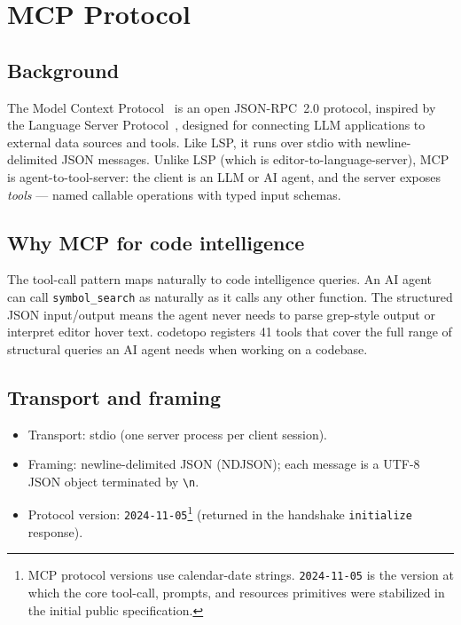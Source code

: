 \section{MCP Protocol}
\label{sec:mcp-protocol}

\subsection{Background}

The Model Context Protocol~\cite{anthropic2024mcp} is an open JSON-RPC~2.0
protocol, inspired by the Language Server Protocol~\cite{microsoft2016lsp},
designed for connecting LLM applications to external data sources and tools.
Like LSP, it runs over stdio with newline-delimited JSON messages. Unlike LSP
(which is editor-to-language-server), MCP is agent-to-tool-server: the
client is an LLM or AI agent, and the server exposes \emph{tools} --- named
callable operations with typed input schemas.

\subsection{Why MCP for code intelligence}

The tool-call pattern maps naturally to code intelligence queries. An AI agent
can call \texttt{symbol\_search} as naturally as it calls any other function.
The structured JSON input/output means the agent never needs to parse
grep-style output or interpret editor hover text. codetopo registers 41 tools
that cover the full range of structural queries an AI agent needs when
working on a codebase.

\subsection{Transport and framing}

\begin{itemize}
  \item Transport: stdio (one server process per client session).
  \item Framing: newline-delimited JSON (NDJSON); each message is a UTF-8
        JSON object terminated by \verb|\n|.
  \item Protocol version: \texttt{2024-11-05}\footnote{MCP protocol versions
        use calendar-date strings. \texttt{2024-11-05} is the version at which
        the core tool-call, prompts, and resources primitives were stabilized
        in the initial public specification.} (returned in the handshake
        \texttt{initialize} response).
\end{itemize}

